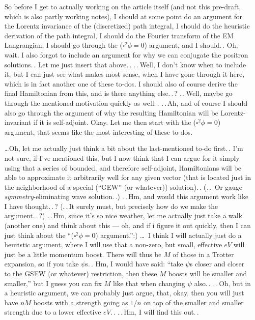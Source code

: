 \documentclass{report}
\begin{document}
So before I get to actually working on the article itself (and not this pre-draft, which is also partly working notes), I should at some point do an argument for the Lorentz invariance of the (discretized) path integral, I should do the heuristic derivation of the path integral, I should do the Fourier transform of the EM Langrangian, I should go through the ($\square^2\phi=0$) argument, and I should.\,. Oh, wait. I also forgot to include an argument for why we can conjugate the positron solutions.\,. Let me just insert that above.\,. .\,.\,Well, I don't know when to include it, but I can just see what makes most sense, when I have gone through it here, which is in fact another one of these to-dos. I should also of course derive the final Hamiltonian from this, and is there anything else.\,.\,? .\,.\,Well, maybe go through the mentioned motivation quickly as well.\,. .\,.\,Ah, and of course I should also go through the argument of why the resulting Hamiltonian will be Lorentz-invariant if it is self-adjoint. Okay. Let me then start with the ($\square^2\phi=0$) argument, that seems like the most interesting of these to-dos.

\ldots Oh, let me actually just think a bit about the last-mentioned to-do first.\,. I'm not sure, if I've mentioned this, but I now think that I can argue for it simply using that a series of bounded, and therefore self-adjoint, Hamiltonians will be able to approximate it arbitrarily well for any given vector (that is located just in the neighborhood of a special (``GEW'' (or whatever)) solution).\,. (.\,.\, Or gauge \emph{symmetry}-eliminating wave solution.\,.) .\,.\,Hm, and would this argument work like I have thought.\,.\,? (.\,.\,It surely must, but precisely how do we make the argument.\,.\,?) .\,.\,Hm, since it's so nice weather, let me actually just take a walk (another one) and think about this --- oh, and if i figure it out quickly, then I can just think about the ``($\square^2\phi=0$) argument.'':) %
\ldots\ I think I will actually just do a heuristic argument, where I will use that a non-zero, but small, effective $eV$ will just be a little momentum boost. There will thus be $M$ of those in a Trotter expansion, so if you take $\psi$s.\,. Hm, I would have said: ``take $\psi$s closer and closer to the GSEW (or whatever) restriction, then these $M$ boosts will be smaller and smaller,'' but I guess you can fix $M$ like that when changing $\psi$ also.\,. .\,.\,Oh, but in a heuristic argument, we can probably just argue, that, okay, then you will just have $nM$ boosts with a strength going as $1/n$ on top of the smaller and smaller strength due to a lower effective $eV$.\,. .\,.\,Hm, I will find this out.\,. %
\end{document}
